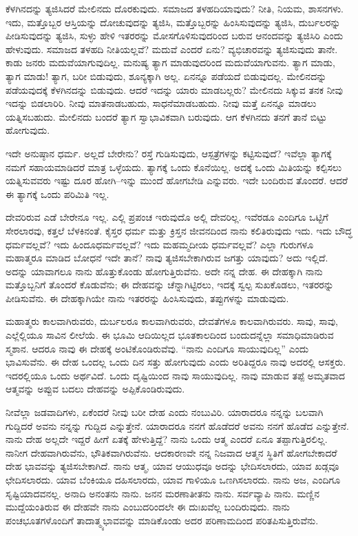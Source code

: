 \vskip 2pt

ಕೆಳಗಿನದನ್ನು ತ್ಯಜಿಸಿದರೆ ಮೇಲಿನದು ದೊರಕುವುದು. ಸಮಾಜದ ತಳಹದಿ\break ಯಾವುದು? ನೀತಿ, ನಿಯಮ, ಶಾಸನಗಳು. ಇದು, ಮತ್ತೊಬ್ಬರ ಆಸ್ತಿಯನ್ನು ದೋಚುವುದನ್ನು ತ್ಯಜಿಸಿ, ಮತ್ತೊಬ್ಬರನ್ನು ಹಿಂಸಿಸುವುದನ್ನು ತ್ಯಜಿಸಿ, ದುರ್ಬಲರನ್ನು ಪೀಡಿಸುವುದನ್ನು ತ್ಯಜಿಸಿ, ಸುಳ್ಳು ಹೇಳಿ ಇತರರನ್ನು ಮೋಸಗೊಳಿಸುವುದರಿಂದ ಬರುವ ಆನಂದವನ್ನು ತ್ಯಜಿಸಿರಿ ಎಂದು ಹೇಳುವುದು. ಸಮಾಜದ ತಳಹದಿ ನೀತಿಯಲ್ಲವೆ? ಮದುವೆ ಎಂದರೆ ಏನು? ವ್ಯಭಿಚಾರವನ್ನು ತ್ಯಜಿಸುವುದು ತಾನೇ. ಕಾಡು ಜನರು ಮದುವೆಯಾಗುವುದಿಲ್ಲ. ಮನುಷ್ಯ ತ್ಯಾಗ ಮಾಡುವುದರಿಂದ ಮದುವೆಯಾಗುವನು. ತ್ಯಾಗ ಮಾಡು, ತ್ಯಾಗ ಮಾಡು! ತ್ಯಾಗ, ಬರೀ ಬಿಡುವುದು, ಶೂನ್ಯಕ್ಕಾಗಿ ಅಲ್ಲ. ಏನನ್ನೂ ಪಡೆಯದೆ ಬಿಡುವುದಲ್ಲ. ಮೇಲಿನದನ್ನು ಪಡೆಯವುದಕ್ಕೆ ಕೆಳಗಿನದನ್ನು ಬಿಡುವುದು. ಆದರೆ ಇದನ್ನು ಯಾರು ಮಾಡಬಲ್ಲರು? ಮೇಲಿನದು ಸಿಕ್ಕುವ ತನಕ ನೀವು ಇದನ್ನು ಬಿಡಲಾರಿರಿ. ನೀವು ಮಾತನಾಡಬಹುದು, ಸಾಧನೆಮಾಡಬಹುದು. ನೀವು ಮತ್ತೆ ಏನನ್ನೂ ಮಾಡಲು ಯತ್ನಿಸಬಹುದು. ಮೇಲಿನದು ಬಂದರೆ ತ್ಯಾಗ ಸ್ವಾಭಾವಿಕವಾಗಿ ಬರುವುದು. ಆಗ ಕೆಳಗಿನದು ತನಗೆ ತಾನೆ ಬಿಟ್ಟು ಹೋಗುವುದು.

ಇದೇ ಅನುಷ್ಠಾನ ಧರ್ಮ. ಅಲ್ಲದೆ ಬೇರೇನು? ರಸ್ತೆ ಗುಡಿಸುವುದು, ಆಸ್ಪತ್ರೆಗಳನ್ನು ಕಟ್ಟಿಸುವುದೆ? ಇವೆಲ್ಲಾ ತ್ಯಾಗಕ್ಕೆ ನಮಗೆ ಸಹಾಯಮಾಡಿದರೆ ಮಾತ್ರ ಒಳ್ಳೆಯದು. ತ್ಯಾಗಕ್ಕೆ ಒಂದು ಕೊನೆಯಿಲ್ಲ. ಅದಕ್ಕೆ ಒಂದು ಮಿತಿಯನ್ನು ಕಲ್ಪಿಸಲು ಯತ್ನಿಸುವವರು ಇಷ್ಟು ದೂರ ಹೋಗಿ–ಇನ್ನು ಮುಂದೆ ಹೋಗಬೇಡಿ ಎನ್ನುವರು. ಇದೇ ಬಂದಿರುವ ತೊಂದರೆ. ಆದರೆ ಈ ತ್ಯಾಗಕ್ಕೆ ಒಂದು ಪರಿಮಿತಿ ಇಲ್ಲ.

ದೇವರಿರುವ ಎಡೆ ಬೇರೇನೂ ಇಲ್ಲ. ಎಲ್ಲಿ ಪ್ರಪಂಚ ಇರುವುದೊ ಅಲ್ಲಿ ದೇವರಿಲ್ಲ. ಇವೆರಡೂ ಎಂದಿಗೂ ಒಟ್ಟಿಗೆ ಸೇರಲಾರವು, ಕತ್ತಲೆ ಬೆಳಕಿನಂತೆ. ಕೈಸ್ತರ ಧರ್ಮ ಮತ್ತು ಕ್ರಿಸ್ತನ ಜೀವನದಿಂದ ನಾನು ಕಲಿತಿರುವುದು ಇದು. ಇದು ಬೌದ್ಧ ಧರ್ಮವಲ್ಲವೆ? ಇದು ಹಿಂದೂಧರ್ಮವಲ್ಲವೆ? ಇದು ಮಹಮ್ಮದೀಯ ಧರ್ಮವಲ್ಲವೆ? ಎಲ್ಲಾ ಗುರುಗಳೂ ಮಹಾತ್ಮರೂ ಮಾಡಿದ ಬೋಧನೆ ಇದೇ ತಾನೆ? ನಾವು ತ್ಯಜಿಸಬೇಕಾಗಿರುವ ಜಗತ್ತು ಯಾವುದು? ಅದು ಇಲ್ಲಿದೆ. ಅದನ್ನು ಯಾವಾಗಲೂ ನಾನು ಹೊತ್ತುಕೊಂಡು ಹೋಗುತ್ತಿರುವೆನು. ಅದೇ ನನ್ನ ದೇಹ. ಈ ದೇಹಕ್ಕಾಗಿ ನಾನು ಮತ್ತೊಬ್ಬನಿಗೆ ತೊಂದರೆ ಕೊಡುವೆನು; ಈ ದೇಹವನ್ನು ಚೆನ್ನಾಗಿಟ್ಟಿರಲು, ಇದಕ್ಕೆ ಸ್ವಲ್ಪ ಸುಖಕೊಡಲು, ಇತರರನ್ನು ಪೀಡಿಸುವೆನು. ಈ ದೇಹಕ್ಕಾಗಿಯೇ ನಾನು ಇತರರನ್ನು ಹಿಂಸಿಸುವುದು, ತಪ್ಪುಗಳನ್ನು ಮಾಡುವುದು.

ಮಹಾತ್ಮರು ಕಾಲವಾಗಿರುವರು, ದುರ್ಬಲರೂ ಕಾಲವಾಗಿರುವರು, ದೇವತೆಗಳೂ ಕಾಲವಾಗಿರುವರು. ಸಾವು, ಸಾವು, ಎಲ್ಲೆಲ್ಲಿಯೂ ಸಾವಿನ ಲೀಲೆಯೆ. ಈ ಭೂಮಿ ಆದಿಯಿಲ್ಲದ ಭೂತಕಾಲದಿಂದ ಬಂದುದನ್ನೆಲ್ಲಾ ಸಮಾಧಿಮಾಡಿರುವ ಸ್ಮಶಾನ. ಆದರೂ ನಾವು ಈ ದೇಹಕ್ಕೆ ಅಂಟಿಕೊಂಡಿರುವೆವು. “ನಾನು ಎಂದಿಗೂ ಸಾಯುವುದಿಲ್ಲ” ಎಂದು ಭಾವಿಸುವೆನು. ಈ ದೇಹ ಒಂದಲ್ಲ ಒಂದು ದಿನ ಸತ್ತು ಹೋಗುವುದು ಎಂದು ಅರಿತಿದ್ದರೂ ನಾವು ಅದರಲ್ಲಿ ಆಸಕ್ತರು. ಇದರಲ್ಲಿಯೂ ಒಂದು ಅರ್ಥವಿದೆ. ಒಂದು ದೃಷ್ಟಿಯಿಂದ ನಾವು ಸಾಯುವುದಿಲ್ಲ. ನಾವು ಮಾಡುವ ತಪ್ಪೆ ಅಮೃತವಾದ ಆತ್ಮವನ್ನು ಅಪ್ಪುವ ಬದಲು ದೇಹವನ್ನು ಅಪ್ಪಿಕೊಂಡಿರುವುದು.

ನೀವೆಲ್ಲಾ ಜಡವಾದಿಗಳು, ಏಕೆಂದರೆ ನೀವು ಬರೀ ದೇಹ ಎಂದು ನಂಬುವಿರಿ. ಯಾರಾದರೂ ನನ್ನನ್ನು ಬಲವಾಗಿ ಗುದ್ದಿದರೆ ಅವನು ನನ್ನನ್ನು ಗುದ್ದಿದ ಎನ್ನುತ್ತೇನೆ. ಯಾರಾದರೂ ನನಗೆ ಹೊಡೆದರೆ ಅವನು ನನಗೆ ಹೊಡೆದ ಎನ್ನುತ್ತೇನೆ. ನಾನು ದೇಹ ಅಲ್ಲದೇ ಇದ್ದರೆ ಹೀಗೆ ಏತಕ್ಕೆ ಹೇಳುತ್ತಿದ್ದೆ? ನಾನು ಒಂದು ಆತ್ಮ ಎಂದರೆ ಏನೂ ತಪ್ಪಾಗುತ್ತಿರಲಿಲ್ಲ. ನಾನೀಗ ದೇಹವಾಗಿರುವೆನು, ಭೌತಿಕವಾಗಿರುವೆನು. ಆದಕಾರಣವೇ ನನ್ನ ನಿಜವಾದ ಆತ್ಮನ ಸ್ಥಿತಿಗೆ ಹೋಗಬೇಕಾದರೆ ದೇಹ ಭಾವವನ್ನು ತ್ಯಜಿಸಬೇಕಾಗಿದೆ. ನಾನು ಆತ್ಮ, ಯಾವ ಆಯುಧವೂ ಅದನ್ನು ಭೇದಿಸಲಾರದು, ಯಾವ ಖಡ್ಗವೂ ಛೇದಿಸಲಾರದು. ಯಾವ ಬೆಂಕಿಯೂ ದಹಿಸಲಾರದು, ಯಾವ ಗಾಳಿಯೂ ಒಣಗಿಸಲಾರದು. ನಾನು ಅಜ, ಎಂದಿಗೂ ಸೃಷ್ಟಿಯಾದವನಲ್ಲ. ಅನಾದಿ ಅನಂತನು ನಾನು. ಜನನ ಮರಣಾತೀತನು ನಾನು. ಸರ್ವವ್ಯಾಪಿ ನಾನು. ಮಣ್ಣಿನ ಮುದ್ದೆಯಂತಿರುವ ಈ ದೇಹವೇ ನಾನು ಎಂಬುದರಿಂದಲೇ ಈ ದುಃಖವೆಲ್ಲ ಬಂದಿರುವುದು. ನಾನು ಪಂಚಭೂತಗಳೊಂದಿಗೆ ತಾದಾತ್ಮ್ಯಭಾವವನ್ನು ಮಾಡಿಕೊಂಡು ಅದರ ಪರಿಣಾಮದಿಂದ ಪರಿತಪಿಸುತ್ತಿರುವೆನು.

